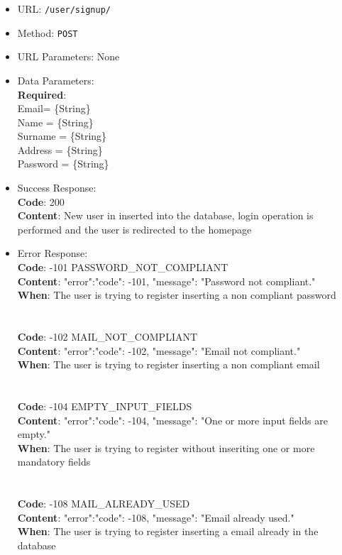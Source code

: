 \begin{itemize}
    \item URL: \texttt{/user/signup/}
    \item Method: \texttt{POST}
    \item URL Parameters: None
    \item Data Parameters: \\
    \textbf{Required}:\\
    Email= \{String\}\\
    Name = \{String\}\\
    Surname = \{String\}\\
    Address = \{String\}\\
    Password = \{String\}\\
    \item Success Response:\\
    \textbf{Code}: 200\\
    \textbf{Content}: New user in inserted into the database, login operation is performed and the user is redirected to the homepage\\
    \item Error Response:\\
    \textbf{Code}: -101 PASSWORD\_NOT\_COMPLIANT\\
    \textbf{Content}: {"error":{"code": -101, "message": "Password not compliant."}}\\
    \textbf{When}: The user is trying to register inserting a non compliant password\\
    \\
    \\
    \textbf{Code}: -102 MAIL\_NOT\_COMPLIANT\\
    \textbf{Content}: {"error":{"code": -102, "message": "Email not compliant."}}\\
    \textbf{When}: The user is trying to register inserting a non compliant email\\
    \\
    \\
    \textbf{Code}: -104 EMPTY\_INPUT\_FIELDS\\
    \textbf{Content}: {"error":{"code": -104, "message": "One or more input fields are empty."}}\\
    \textbf{When}: The user is trying to register without inseriting one or more mandatory fields\\
    \\
    \\
    \textbf{Code}: -108 MAIL\_ALREADY\_USED\\
    \textbf{Content}: {"error":{"code": -108, "message": "Email already used."}}\\
    \textbf{When}: The user is trying to register inserting a email already in the database\\
    \\
    \\
\end{itemize}


